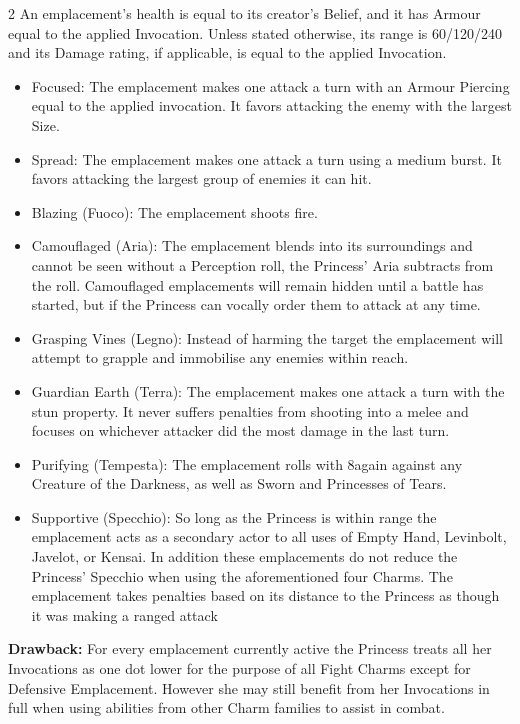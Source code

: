 \begin{multicols}{2}
An emplacement's health is equal to its creator's Belief, and it has Armour equal to the applied Invocation. Unless stated otherwise, its range is 60/120/240 and its Damage rating, if applicable, is equal to the applied Invocation. 

 \begin{itemize}
 \item Focused: The emplacement makes one attack a turn with an Armour Piercing equal to the applied invocation. It favors attacking the enemy with the largest Size. 
 \item Spread: The emplacement makes one attack a turn using a medium burst. It favors attacking the largest group of enemies it can hit. 
 \item Blazing (Fuoco): The emplacement shoots fire.
 \item Camouflaged (Aria): The emplacement blends into its surroundings and cannot be seen without a Perception roll, the Princess' Aria subtracts from the roll. Camouflaged emplacements will remain hidden until a battle has started, but if the Princess can vocally order them to attack at any time. 
 \item Grasping Vines (Legno): Instead of harming the target the emplacement will attempt to grapple and immobilise any enemies within reach. 
 \item Guardian Earth (Terra): The emplacement makes one attack a turn with the stun property. It never suffers penalties from shooting into a melee and focuses on whichever attacker did the most damage in the last turn. 
 \item Purifying (Tempesta): The emplacement rolls with 8again against any Creature of the Darkness, as well as Sworn and Princesses of Tears.
 \item Supportive (Specchio): So long as the Princess is within range the emplacement acts as a secondary actor to all uses of Empty Hand, Levinbolt, Javelot, or Kensai. In addition these emplacements do not reduce the Princess' Specchio when using the aforementioned four Charms. The emplacement takes penalties based on its distance to the Princess as though it was making a ranged attack
 \end{itemize}
 
 \textbf{Drawback:} For every emplacement currently active the Princess treats all her Invocations as one dot lower for the purpose of all Fight Charms except for Defensive Emplacement. However she may still benefit from her Invocations in full when using abilities from other Charm families to assist in combat. 
 

\end{multicols}
